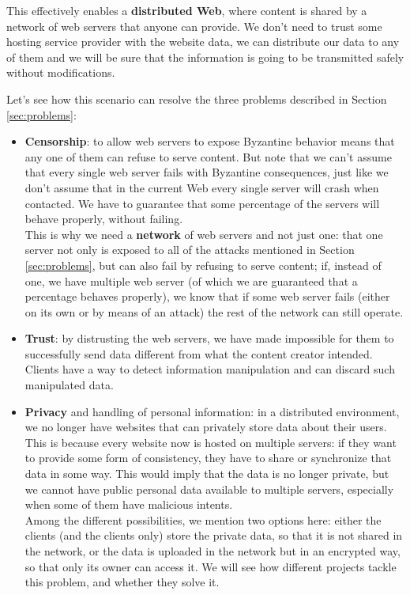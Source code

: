 \documentclass[mscthesis]{usiinfthesis}
\begin{document}
This effectively enables a \textbf{distributed Web}, where content is shared by a network of web servers that anyone can provide. We don't need to trust some hosting service provider with the website data, we can distribute our data to any of them and we will be sure that the information is going to be transmitted safely without modifications.

Let's see how this scenario can resolve the three problems described in Section \ref{sec:problems}:
\begin{itemize}
	\item \textbf{Censorship}: to allow web servers to expose Byzantine behavior means that any one of them can refuse to serve content. But note that we can't assume that every single web server fails with Byzantine consequences, just like we don't assume that in the current Web every single server will crash when contacted. We have to guarantee that some percentage of the servers will behave properly, without failing.\\
	This is why we need a \textbf{network} of web servers and not just one: that one server not only is exposed to all of the attacks mentioned in Section \ref{sec:problems}, but can also fail by refusing to serve content; if, instead of one, we have multiple web server (of which we are guaranteed that a percentage behaves properly), we know that if some web server fails (either on its own or by means of an attack) the rest of the network can still operate.

	\item \textbf{Trust}: by distrusting the web servers, we have made impossible for them to successfully send data different from what the content creator intended. Clients have a way to detect information manipulation and can discard such manipulated data.

	\item \textbf{Privacy} and handling of personal information: in a distributed environment, we no longer have websites that can privately store data about their users. This is because every website now is hosted on multiple servers: if they want to provide some form of consistency, they have to share or synchronize that data in some way. This would imply that the data is no longer private, but we cannot have public personal data available to multiple servers, especially when some of them have malicious intents.\\
	Among the different possibilities, we mention two options here: either the clients (and the clients only) store the private data, so that it is not shared in the network, or the data is uploaded in the network but in an encrypted way, so that only its owner can access it. We will see how different projects tackle this problem, and whether they solve it.
\end{itemize}
\end{document}
